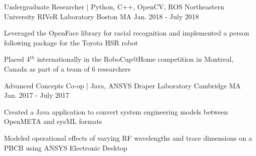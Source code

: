 \begin{cventries}
  \cventry
    {Undergraduate Researcher | Python, C++, OpenCV, ROS} %
    {Northeastern University RIVeR Laboratory} %
    {Boston MA} %
    {Jan. 2018 - July 2018} %
    {
      \begin{cvitems} %
        \item {Leveraged the OpenFace library for racial recognition and implemented a person following package for the Toyota HSR robot}
        \item {Placed 4$^{th}$ internationally in the RoboCup@Home competition in Montreal, Canada as part of a team of 6 researchers}
      \end{cvitems}
    }

  \cventry
    {Advanced Concepts Co-op | Java, ANSYS} %
    {Draper Laboratory} %
    {Cambridge MA} %
    {Jan. 2017 - July 2017} %
    {
      \begin{cvitems} %
        \item {Created a Java application to convert system engineering models between OpenMETA and sysML formats}
        \item {Modeled operational effects of varying RF wavelengths and trace dimensions on a PBCB using ANSYS Electronic Desktop}
      \end{cvitems}
    }

\end{cventries}
